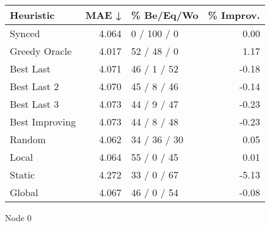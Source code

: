 \begin{tabular}{lrlr}
\toprule
\textbf{Heuristic} & \textbf{MAE ↓} & \textbf{\% Be/Eq/Wo} & \textbf{\% Improv.} \\
\midrule
            Synced &          4.064 &          0 / 100 / 0 &                0.00 \\
     Greedy Oracle &          4.017 &          52 / 48 / 0 &                1.17 \\
         Best Last &          4.071 &          46 / 1 / 52 &               -0.18 \\
       Best Last 2 &          4.070 &          45 / 8 / 46 &               -0.14 \\
       Best Last 3 &          4.073 &          44 / 9 / 47 &               -0.23 \\
    Best Improving &          4.073 &          44 / 8 / 48 &               -0.23 \\
            Random &          4.062 &         34 / 36 / 30 &                0.05 \\
             Local &          4.064 &          55 / 0 / 45 &                0.01 \\
            Static &          4.272 &          33 / 0 / 67 &               -5.13 \\
            Global &          4.067 &          46 / 0 / 54 &               -0.08 \\
\bottomrule
\end{tabular}
\caption{Node 0}
\label{tab:hr_non_lr01_le2_bs4_0}
